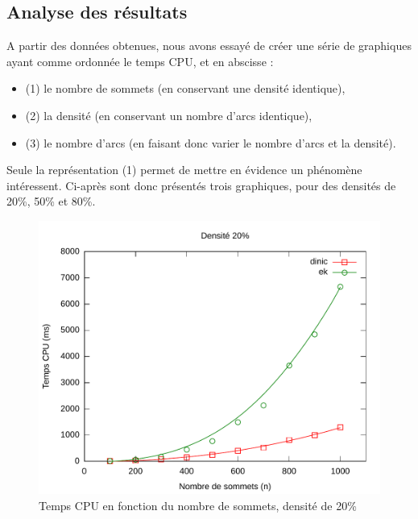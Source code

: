 \subsection{Analyse des résultats}

A partir des données obtenues, nous avons essayé de créer une série de graphiques ayant comme ordonnée le temps CPU, et en abscisse :
\begin{itemize}
  \item (1) le nombre de sommets (en conservant une densité identique),
  \item (2) la densité (en conservant un nombre d'arcs identique),
  \item (3) le nombre d'arcs (en faisant donc varier le nombre d'arcs et la densité).
\end{itemize}

Seule la représentation (1) permet de mettre en évidence un phénomène intéressent. Ci-après sont donc présentés trois graphiques, pour des densités de 20\%, 50\% et 80\%.

\begin{figure}[h!]
\begin{center}
\includegraphics[width=\textwidth]{files/c20}
\end{center}
\caption{Temps CPU en fonction du nombre de sommets, densité de 20\%}
\end{figure}

